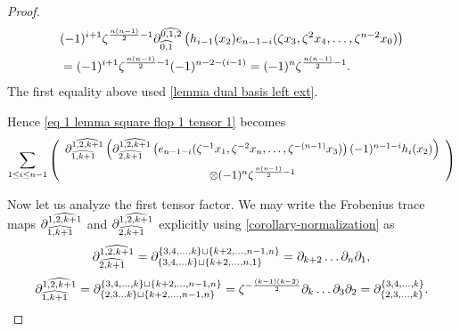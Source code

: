 \begin{proof}
     \begin{align}
    &(-1)^{i+1}\zeta^{\frac{n(n-1)}{2} -1} \partial^{\widehat{0,1,2}}_{\widehat{0,1}}\left(
    h_{i-1}(x_2)
    e_{n-1-i}(\zeta x_3, \zeta^2 x_4, \ldots , \zeta^{n-2}x_0)
    \right)\\ \nonumber
    &=(-1)^{i+1}\zeta^{\frac{n(n-1)}{2}-1} (-1)^{n-2-(i-1)}
    =(-1)^{n}\zeta^{\frac{n(n-1)}{2}-1}.
    \end{align}
    The first equality above used \cref{lemma dual basis left ext}.
    

    Hence \eqref{eq 1 lemma square flop 1 tensor 1} becomes
    \begin{align}
    \sum_{1\leq i \leq n-1} \left( \begin{array}{c}
    \ddm{1,2, k+1}{1,k+1}\left(\ddm{1,2,k+1}{2,k+1}\left(e_{n-1-i}(\zeta^{-1}x_1, \zeta^{-2}x_n, \ldots , \zeta^{-(n-1)}x_3)\right)(-1)^{n-1-i}h_{i}(x_2)\right) \vspace{5 pt}\\ \otimes (-1)^{n}\zeta^{\frac{n(n-1)}{2}-1} \label{eq 2 lemma square flop 1 tensor 1}
    \end{array}\right)
    \end{align}

    Now let us analyze the first tensor factor.
    We may write the Frobenius trace maps $\partial^{\widehat{1,2, k+1}}_{\widehat{1,k+1}}$ and $\partial^{\widehat{1,2,k+1}}_{\widehat{2,k+1}}$ explicitly using \cref{corollary-normalization} as
    \[\partial^{\widehat{1,2,k+1}}_{\widehat{2,k+1}}=\partial^{\{3, 4, \ldots , k\} \sqcup \{k+2, \ldots, n-1, n\}}_{\{3,4, \ldots k\}\sqcup \{k+2,\ldots,n,1\}}=\partial_{k+2}\ldots \partial_n \partial_1, \]
    \[ \partial^{\widehat{1,2,k+1}}_{\widehat{1,k+1}}=\partial^{\{3, 4, \ldots , k\} \sqcup \{k+2, \ldots, n-1, n\}}_{\{2,3 \ldots k\}\sqcup \{k+2,\ldots,n-1, n\}}=\zeta^{-\frac{(k-1)(k-2)}{2}}\partial_k \ldots \partial_3 \partial_2=\partial^{\{3,4, \ldots, k\}}_{\{2, 3, \ldots, k\}}.\]


\end{proof}

